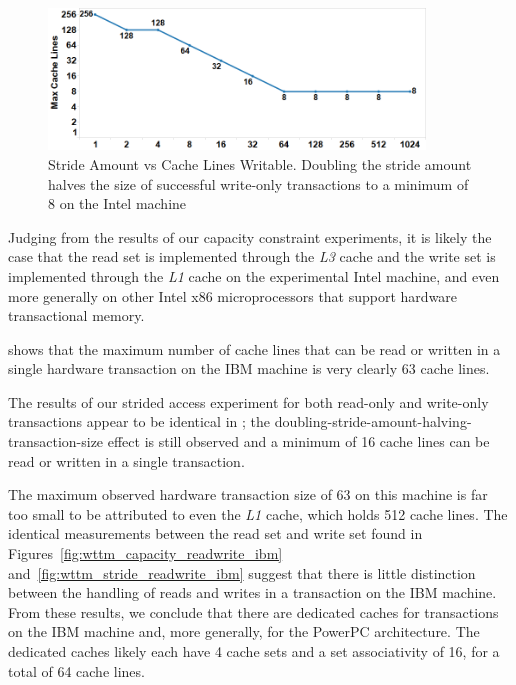\begin{figure}[]%
\centering
\includegraphics[width=10cm]{images/wttm_stride_write_intel}
\caption{Stride Amount vs Cache Lines Writable. 
Doubling the stride amount halves the size of successful write-only
transactions to a minimum of 8 on the Intel machine}
\label{fig:wttm_stride_write_intel}
\end{figure}

Judging from the results of our capacity constraint experiments, it is likely
the case that the read set is implemented through the \textit{L3} cache and the
write set is implemented through the \textit{L1} cache on the experimental Intel
machine, and even more generally on other Intel x86 microprocessors that support
hardware transactional memory.


 shows that the maximum number of
cache lines that can be read or written in a single hardware transaction on the
IBM machine is very clearly 63 cache lines.

The results of our strided access experiment for both read-only and write-only
transactions appear to be identical in
; the
doubling-stride-amount-halving-transaction-size effect is still observed and a
minimum of 16 cache lines can be read or written in a single transaction.

The maximum observed hardware transaction size of 63 on this machine is far too
small to be attributed to even the \textit{L1} cache, which holds 512 cache
lines. The identical measurements between the read set and write set found in
Figures~\ref{fig:wttm_capacity_readwrite_ibm}
and~\ref{fig:wttm_stride_readwrite_ibm} suggest that there is little distinction
between the handling of reads and writes in a transaction on the IBM machine.
From these results, we conclude that there are dedicated caches for transactions
on the IBM machine and, more generally, for the PowerPC architecture. The
dedicated caches likely each have 4 cache sets and a set associativity of 16,
for a total of 64 cache lines.

